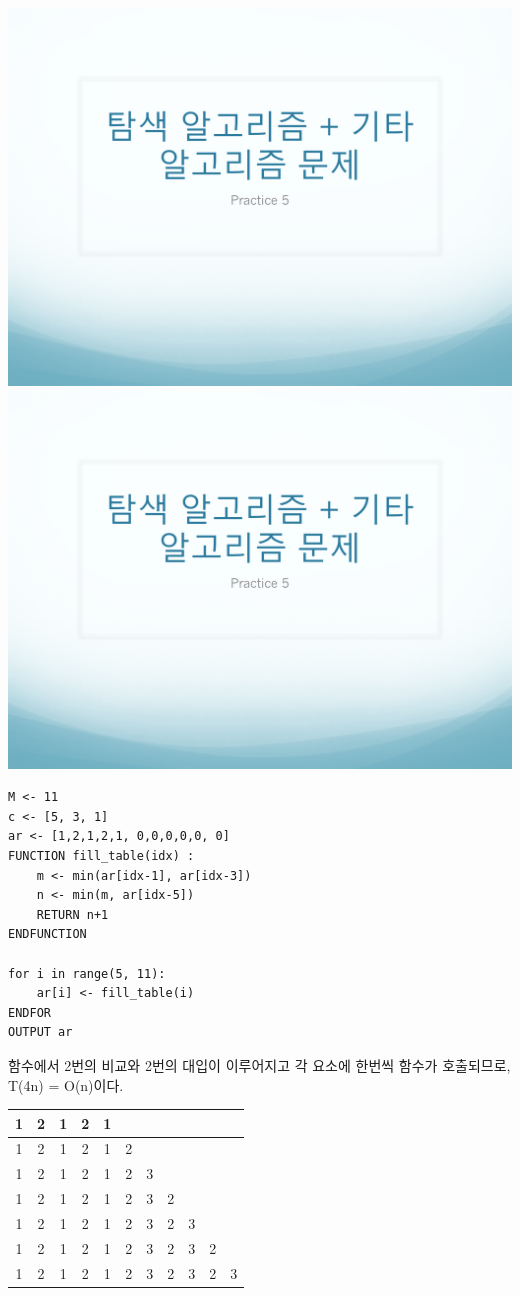 \documentclass[12pt,a4paper]{article}
\begin{document}
\includegraphics[page=3, width=\textwidth]{1.pdf}
\includegraphics[page=4, width=\textwidth]{1.pdf}
\begin{lstlisting}
M <- 11
c <- [5, 3, 1]
ar <- [1,2,1,2,1, 0,0,0,0,0, 0]
FUNCTION fill_table(idx) :
    m <- min(ar[idx-1], ar[idx-3])
    n <- min(m, ar[idx-5])
    RETURN n+1
ENDFUNCTION

for i in range(5, 11):
    ar[i] <- fill_table(i)
ENDFOR
OUTPUT ar
\end{lstlisting}
함수에서 2번의 비교와 2번의 대입이 이루어지고 각 요소에 한번씩 함수가 호출되므로,
T(4n) = O(n)이다.\\

\begin{tabular}{|c|c|c|c|c|c|c|c|c|c|c|}
	\hline
	1&2&1&2&1& &&&&&\\
	\hline
	1&2&1&2&1&2&&&&&\\
	\hline
	1&2&1&2&1&2&3&&&& \\
	\hline
	1&2&1&2&1&2&3&2&&& \\
	\hline
	1&2&1&2&1&2&3&2&3&& \\
	\hline
	1&2&1&2&1&2&3&2&3&2& \\
	\hline
	1&2&1&2&1&2&3&2&3&2&3 \\
	\hline
\end{tabular}
\vspace{1cm}
\end{document}
